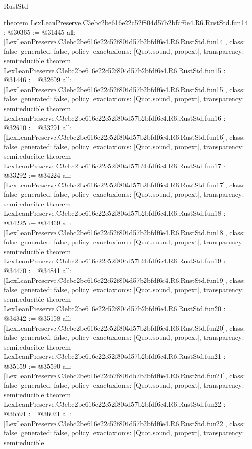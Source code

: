 \begin{lexlean}{RustStd}
\begin{coremodule}
{}
theorem LexLeanPreserve.C3ebc2be616e22c52f804d57b2bfdf6e4.R6.RustStd.fun14 : @30365 := @31445 {
  all: [LexLeanPreserve.C3ebc2be616e22c52f804d57b2bfdf6e4.R6.RustStd.fun14],
  class: false,
  generated: false,
  policy: exact{axioms: [Quot.sound, propext]},
  transparency: semireducible
}
theorem LexLeanPreserve.C3ebc2be616e22c52f804d57b2bfdf6e4.R6.RustStd.fun15 : @31446 := @32609 {
  all: [LexLeanPreserve.C3ebc2be616e22c52f804d57b2bfdf6e4.R6.RustStd.fun15],
  class: false,
  generated: false,
  policy: exact{axioms: [Quot.sound, propext]},
  transparency: semireducible
}
theorem LexLeanPreserve.C3ebc2be616e22c52f804d57b2bfdf6e4.R6.RustStd.fun16 : @32610 := @33291 {
  all: [LexLeanPreserve.C3ebc2be616e22c52f804d57b2bfdf6e4.R6.RustStd.fun16],
  class: false,
  generated: false,
  policy: exact{axioms: [Quot.sound, propext]},
  transparency: semireducible
}
theorem LexLeanPreserve.C3ebc2be616e22c52f804d57b2bfdf6e4.R6.RustStd.fun17 : @33292 := @34224 {
  all: [LexLeanPreserve.C3ebc2be616e22c52f804d57b2bfdf6e4.R6.RustStd.fun17],
  class: false,
  generated: false,
  policy: exact{axioms: [Quot.sound, propext]},
  transparency: semireducible
}
theorem LexLeanPreserve.C3ebc2be616e22c52f804d57b2bfdf6e4.R6.RustStd.fun18 : @34225 := @34469 {
  all: [LexLeanPreserve.C3ebc2be616e22c52f804d57b2bfdf6e4.R6.RustStd.fun18],
  class: false,
  generated: false,
  policy: exact{axioms: [Quot.sound, propext]},
  transparency: semireducible
}
theorem LexLeanPreserve.C3ebc2be616e22c52f804d57b2bfdf6e4.R6.RustStd.fun19 : @34470 := @34841 {
  all: [LexLeanPreserve.C3ebc2be616e22c52f804d57b2bfdf6e4.R6.RustStd.fun19],
  class: false,
  generated: false,
  policy: exact{axioms: [Quot.sound, propext]},
  transparency: semireducible
}
theorem LexLeanPreserve.C3ebc2be616e22c52f804d57b2bfdf6e4.R6.RustStd.fun20 : @34842 := @35158 {
  all: [LexLeanPreserve.C3ebc2be616e22c52f804d57b2bfdf6e4.R6.RustStd.fun20],
  class: false,
  generated: false,
  policy: exact{axioms: [Quot.sound, propext]},
  transparency: semireducible
}
theorem LexLeanPreserve.C3ebc2be616e22c52f804d57b2bfdf6e4.R6.RustStd.fun21 : @35159 := @35590 {
  all: [LexLeanPreserve.C3ebc2be616e22c52f804d57b2bfdf6e4.R6.RustStd.fun21],
  class: false,
  generated: false,
  policy: exact{axioms: [Quot.sound, propext]},
  transparency: semireducible
}
theorem LexLeanPreserve.C3ebc2be616e22c52f804d57b2bfdf6e4.R6.RustStd.fun22 : @35591 := @36021 {
  all: [LexLeanPreserve.C3ebc2be616e22c52f804d57b2bfdf6e4.R6.RustStd.fun22],
  class: false,
  generated: false,
  policy: exact{axioms: [Quot.sound, propext]},
  transparency: semireducible
}
\end{coremodule}
\end{lexlean}
